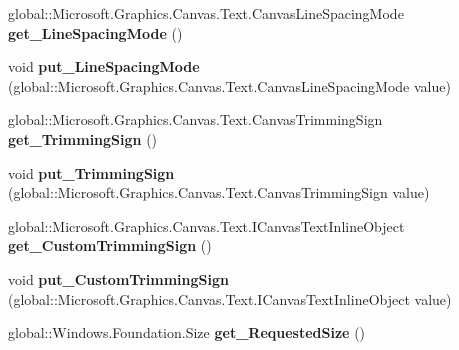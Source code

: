 \begin{DoxyCompactItemize}
global\+::\+Microsoft.\+Graphics.\+Canvas.\+Text.\+Canvas\+Line\+Spacing\+Mode {\bfseries get\+\_\+\+Line\+Spacing\+Mode} ()
\item 
\mbox{\label{interface_microsoft_1_1_graphics_1_1_canvas_1_1_text_1_1_i_canvas_text_layout_a36fefc4917fac46be5776c84bed1b9de}} 
void {\bfseries put\+\_\+\+Line\+Spacing\+Mode} (global\+::\+Microsoft.\+Graphics.\+Canvas.\+Text.\+Canvas\+Line\+Spacing\+Mode value)
\item 
\mbox{\label{interface_microsoft_1_1_graphics_1_1_canvas_1_1_text_1_1_i_canvas_text_layout_aad4b6c408a3d13911d9e3f2963901bfe}} 
global\+::\+Microsoft.\+Graphics.\+Canvas.\+Text.\+Canvas\+Trimming\+Sign {\bfseries get\+\_\+\+Trimming\+Sign} ()
\item 
\mbox{\label{interface_microsoft_1_1_graphics_1_1_canvas_1_1_text_1_1_i_canvas_text_layout_a8c2b11a3188f814249a73e55f40fd37b}} 
void {\bfseries put\+\_\+\+Trimming\+Sign} (global\+::\+Microsoft.\+Graphics.\+Canvas.\+Text.\+Canvas\+Trimming\+Sign value)
\item 
\mbox{\label{interface_microsoft_1_1_graphics_1_1_canvas_1_1_text_1_1_i_canvas_text_layout_a78438d223733b9e461f4db23c339b79e}} 
global\+::\+Microsoft.\+Graphics.\+Canvas.\+Text.\+I\+Canvas\+Text\+Inline\+Object {\bfseries get\+\_\+\+Custom\+Trimming\+Sign} ()
\item 
\mbox{\label{interface_microsoft_1_1_graphics_1_1_canvas_1_1_text_1_1_i_canvas_text_layout_ad0963a1a76ce3a3b271681e1b918507a}} 
void {\bfseries put\+\_\+\+Custom\+Trimming\+Sign} (global\+::\+Microsoft.\+Graphics.\+Canvas.\+Text.\+I\+Canvas\+Text\+Inline\+Object value)
\item 
\mbox{\label{interface_microsoft_1_1_graphics_1_1_canvas_1_1_text_1_1_i_canvas_text_layout_a1841b5e910690e9cee09e1ac213a8ac1}} 
global\+::\+Windows.\+Foundation.\+Size {\bfseries get\+\_\+\+Requested\+Size} ()

\end{DoxyCompactItemize}
